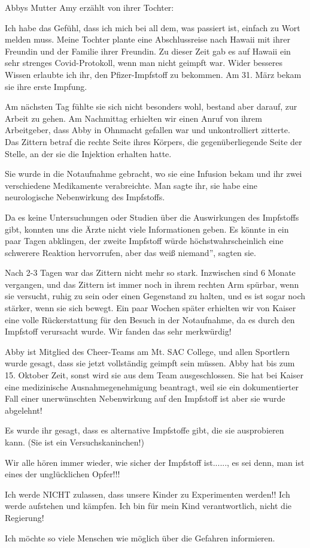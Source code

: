Abbys Mutter Amy erzählt von ihrer Tochter:

Ich habe das Gefühl, dass ich mich bei all dem, was passiert ist, einfach zu
Wort melden muss. Meine Tochter plante eine Abschlussreise nach Hawaii mit ihrer
Freundin und der Familie ihrer Freundin. Zu dieser Zeit gab es auf Hawaii ein
sehr strenges Covid-Protokoll, wenn man nicht geimpft war. Wider besseres Wissen
erlaubte ich ihr, den Pfizer-Impfstoff zu bekommen. Am 31. März bekam sie ihre
erste Impfung.

Am nächsten Tag fühlte sie sich nicht besonders wohl, bestand aber darauf, zur
Arbeit zu gehen. Am Nachmittag erhielten wir einen Anruf von ihrem Arbeitgeber,
dass Abby in Ohnmacht gefallen war und unkontrolliert zitterte. Das Zittern
betraf die rechte Seite ihres Körpers, die gegenüberliegende Seite der Stelle,
an der sie die Injektion erhalten hatte.

Sie wurde in die Notaufnahme gebracht, wo sie eine Infusion bekam und ihr zwei
verschiedene Medikamente verabreichte. Man sagte ihr, sie habe eine
neurologische Nebenwirkung des Impfstoffs.

Da es keine Untersuchungen oder Studien über die Auswirkungen des Impfstoffs
gibt, konnten uns die Ärzte nicht viele Informationen geben. Es könnte in ein
paar Tagen abklingen, der zweite Impfstoff würde höchstwahrscheinlich eine
schwerere Reaktion hervorrufen, aber das weiß niemand'', sagten sie.

Nach 2-3 Tagen war das Zittern nicht mehr so stark. Inzwischen sind 6 Monate
vergangen, und das Zittern ist immer noch in ihrem rechten Arm spürbar, wenn sie
versucht, ruhig zu sein oder einen Gegenstand zu halten, und es ist sogar noch
stärker, wenn sie sich bewegt. Ein paar Wochen später erhielten wir von Kaiser
eine volle Rückerstattung für den Besuch in der Notaufnahme, da es durch den
Impfstoff verursacht wurde. Wir fanden das sehr merkwürdig!

Abby ist Mitglied des Cheer-Teams am Mt. SAC College, und allen Sportlern wurde
gesagt, dass sie jetzt vollständig geimpft sein müssen. Abby hat bis zum
15. Oktober Zeit, sonst wird sie aus dem Team ausgeschlossen. Sie hat bei Kaiser
eine medizinische Ausnahmegenehmigung beantragt, weil sie ein dokumentierter
Fall einer unerwünschten Nebenwirkung auf den Impfstoff ist aber sie wurde
abgelehnt!

Es wurde ihr gesagt, dass es alternative Impfstoffe gibt, die sie ausprobieren
kann. (Sie ist ein Versuchskaninchen!)

Wir alle hören immer wieder, wie sicher der Impfstoff ist......, es sei denn,
man ist eines der unglücklichen Opfer!!!

Ich werde NICHT zulassen, dass unsere Kinder zu Experimenten werden!! Ich werde
aufstehen und kämpfen. Ich bin für mein Kind verantwortlich, nicht die
Regierung!

Ich möchte so viele Menschen wie möglich über die Gefahren informieren.
